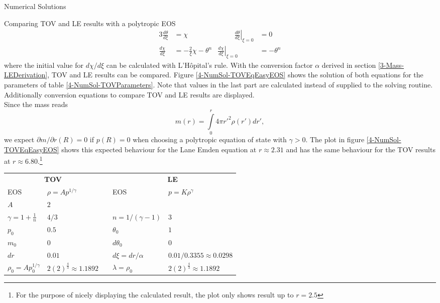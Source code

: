 \begin{section}{Numerical Solutions}
\begin{subsection}{Comparing TOV and LE results with a polytropic EOS}
\begin{alignat}{3}
	\frac{d\theta}{d\xi} &= \chi &\hspace{1cm} \left.\frac{d\theta}{d\xi}\right|_{\xi=0} &= 0\\
	\frac{d\chi}{d\xi} &= -\frac{2}{\xi}\chi-\theta^n & \left.\frac{d\chi}{d\xi}\right|_{\xi=0} &= -\theta^n
	\label{4-NumSol-LE-Substitution}
\end{alignat}
where the initial value for $d\chi/d\xi$ can be calculated with L'Hôpital's rule. With the conversion factor $\alpha$ derived in section \ref{3-Mass-LEDerivation}, TOV and LE results can be compared. Figure \ref{4-NumSol-TOVEqEasyEOS} shows the solution of both equations for the parameters of table \ref{4-NumSol-TOVParameters}. Note that values in the last part are calculated instead of supplied to the solving routine. Additionally conversion equations to compare TOV and LE results are displayed.\\
Since the mass reads
\begin{equation}
	m(r) = \int\limits_0^r 4\pi r'^2\rho(r')dr',
\end{equation}
we expect $\partial m/\partial r(R)=0$ if $p(R)=0$ when choosing a polytropic equation of state with $\gamma>0$. The plot in figure \ref{4-NumSol-TOVEqEasyEOS} shows this expected behaviour for the Lane Emden equation at $r\approx2.31$ and has the same behaviour for the TOV results at $r\approx6.80$.\footnote{For the purpose of nicely displaying the calculated result, the plot only shows result up to $r=2.5$}
\begin{table}[H]
	\renewcommand{\arraystretch}{1.2}
	\centering
	\begin{tabular}{@{}llcll@{}}
		\toprule
		\multicolumn{2}{c}{\textbf{TOV}} & \phantom{abc} &\multicolumn{2}{c}{\textbf{LE}}\\
		\cmidrule{1-2} \cmidrule{4-5}
		EOS & $\rho=Ap^{1/\gamma}$ && EOS & $p=K\rho^{\gamma}$\\
		$A$ & $2$ & & \\
		$\gamma=1+\frac{1}{n}$ & $4/3$ && $n=1/(\gamma-1)$ & $3$\\
		$p_0$ & $0.5$ && $\theta_0$ & $1$\\
		$m_0$ & $0$ && $d\theta_0$ & $0$\\
		$dr$ & $0.01$ && $d\xi=dr/\alpha$ & $0.01/0.3355\approx0.0298$\\
		\cmidrule{1-2} \cmidrule{4-5}
		$\rho_0=Ap_0^{1/\gamma}$ & $2(2)^{\frac{4}{3}}\approx1.1892$ && $\lambda=\rho_0$ & $2(2)^{\frac{4}{3}}\approx1.1892$\\

\end{tabular}
\end{table}
\end{subsection}
\end{section}
